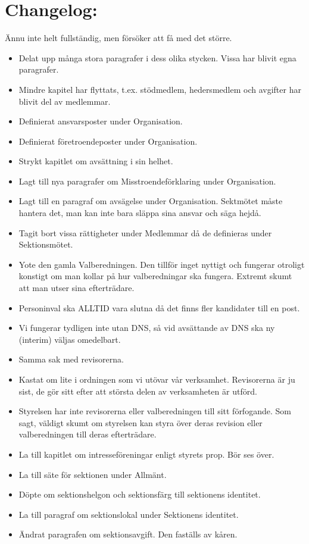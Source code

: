 \documentclass[a4paper]{dteklag}
\begin{document}
\section{Changelog:}
Ännu inte helt fullständig, men försöker att få med det större.
\begin{itemize}
  \item Delat upp många stora paragrafer i dess olika stycken. Vissa har blivit egna paragrafer.
  \item Mindre kapitel har flyttats, t.ex. stödmedlem, hedersmedlem och avgifter har blivit del av medlemmar.
  \item Definierat ansvarsposter under Organisation.
  \item Definierat företroendeposter under Organisation.
  \item Strykt kapitlet om avsättning i sin helhet.
  \item Lagt till nya paragrafer om Misstroendeförklaring under Organisation.
  \item Lagt till en paragraf om avsägelse under Organisation. Sektmötet måste hantera det, man kan inte bara släppa sina ansvar och säga hejdå.
  \item Tagit bort vissa rättigheter under Medlemmar då de definieras under Sektionsmötet.
  \item Yote den gamla Valberedningen. Den tillför inget nyttigt och fungerar otroligt konstigt om man kollar på hur valberedningar ska fungera. Extremt skumt att man utser sina efterträdare.
  \item Personinval ska ALLTID vara slutna då det finns fler kandidater till en post.
  \item Vi fungerar tydligen inte utan DNS, så vid avsättande av DNS ska ny (interim) väljas omedelbart.
  \item Samma sak med revisorerna.
  \item Kastat om lite i ordningen som vi utövar vår verksamhet. Revisorerna är ju sist, de gör sitt efter att största delen av verksamheten är utförd.
  \item Styrelsen har inte revisorerna eller valberedningen till sitt förfogande. Som sagt, väldigt skumt om styrelsen kan styra över deras revision eller valberedningen till deras efterträdare.
  \item La till kapitlet om intresseföreningar enligt styrets prop. Bör ses över.
  \item La till säte för sektionen under Allmänt.
  \item Döpte om sektionshelgon och sektionsfärg till sektionens identitet.
  \item La till paragraf om sektionslokal under Sektionens identitet.
  \item Ändrat paragrafen om sektionsavgift. Den faställs av kåren.
\end{itemize}
\end{document}
